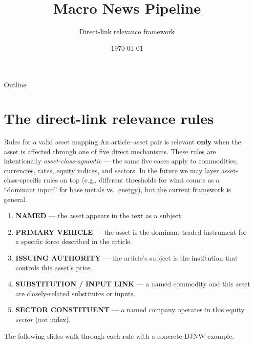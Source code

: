 \documentclass[10pt,aspectratio=169]{beamer}
\title{Macro News Pipeline}
\subtitle{Direct-link relevance framework}
\date{\today}
\begin{document}
\maketitle

\begin{frame}{Outline}
  \tableofcontents
\end{frame}
\section{The direct-link relevance rules}

\begin{frame}{Rules for a valid asset mapping}
  \small
  An article--asset pair is relevant \textbf{only} when the asset is affected
  through one of five direct mechanisms. These rules are intentionally
  \emph{asset-class-agnostic} --- the same five cases apply to commodities,
  currencies, rates, equity indices, and sectors. In the future we may layer
  asset-class-specific rules on top (e.g., different thresholds for what
  counts as a ``dominant input'' for base metals vs.\ energy), but the
  current framework is general.

  \medskip
  \begin{enumerate}
    \item \textbf{NAMED} --- the asset appears in the text as a subject.
    \item \textbf{PRIMARY VEHICLE} --- the asset is the dominant traded
          instrument for a specific force described in the article.
    \item \textbf{ISSUING AUTHORITY} --- the article's subject is the
          institution that controls this asset's price.
    \item \textbf{SUBSTITUTION / INPUT LINK} --- a named commodity and this
          asset are closely-related substitutes or inputs.
    \item \textbf{SECTOR CONSTITUENT} --- a named company operates in this
          equity \emph{sector} (not index).
  \end{enumerate}

  \medskip
  The following slides walk through each rule with a concrete DJNW example.
\end{frame}
\end{document}
